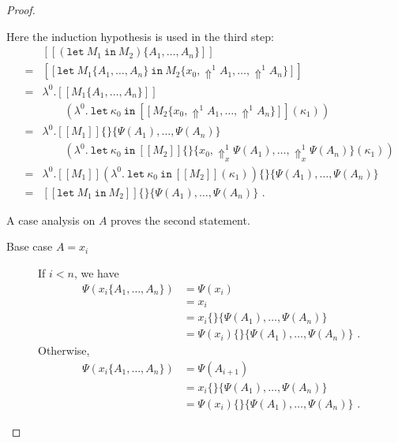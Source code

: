 \documentclass[a4paper,11pt,draft]{article}
\newcommand{\kw}[1]{\mathtt{#1}}
\begin{document}
\begin{proof}
\begin{description}
  Here the induction hypothesis is used in the third step:
  \begin{eqnarray*} %
    &   & [\![(\kw{let} \: M_{1} \: \kw{in} \: M_{2})\{A_{1}, \ldots, A_{n}\}]\!] \\
    & = & [\![\kw{let} \: M_{1}\{A_{1}, \ldots, A_{n}\} \: \kw{in} \: M_{2}\{x_{0}, \Uparrow^{1} A_{1}, \ldots, \Uparrow^{1} A_{n}\}]\!] \\
    & = & \lambda^{0}.[\![M_{1}\{A_{1}, \ldots, A_{n}\}]\!] \\
    &   & \qquad (\lambda^{0}. \: \kw{let} \: \kappa_{0} \: \kw{in} \: [\![M_{2}\{x_{0}, \Uparrow^{1} A_{1}, \ldots, \Uparrow^{1} A_{n}\}]\!](\kappa_{1})) \\
    & = & \lambda^{0}.[\![M_{1}]\!]\{\}\{\Psi(A_{1}), \ldots, \Psi(A_{n})\} \\
    &   & \qquad (\lambda^{0}. \: \kw{let} \: \kappa_{0} \: \kw{in} \: [\![M_{2}]\!]\{\}\{x_{0}, \Uparrow_{x}^{1} \Psi(A_{1}), \ldots, \Uparrow_{x}^{1} \Psi(A_{n})\}(\kappa_{1})) \\
    & = & \lambda^{0}.[\![M_{1}]\!](\lambda^{0}. \: \kw{let} \: \kappa_{0} \: \kw{in} \: [\![M_{2}]\!](\kappa_{1}))\{\}\{\Psi(A_{1}), \ldots, \Psi(A_{n})\} \\
    & = & [\![\kw{let} \: M_{1} \: \kw{in} \: M_{2}]\!]\{\}\{\Psi(A_{1}), \ldots, \Psi(A_{n})\} \text{ .}
  \end{eqnarray*}
\end{description}

A case analysis on $A$ proves the second statement.

\begin{description}
\item[\sffamily Base case $A = x_{i}$]\hfill

  If $i < n$, we have
  \begin{align*}
    \Psi(x_{i}\{A_{1}, \ldots, A_{n}\}) &= \Psi(x_{i}) \\
                                      &= x_{i} \\
                                      &= x_{i}\{\}\{\Psi(A_{1}), \ldots, \Psi(A_{n})\} \\
                                      &= \Psi(x_{i})\{\}\{\Psi(A_{1}), \ldots, \Psi(A_{n})\} \text{ .}
  \end{align*}
  Otherwise,
  \begin{align*}
    \Psi(x_{i}\{A_{1}, \ldots, A_{n}\}) &= \Psi(A_{i+1}) \\
                                      &= x_{i}\{\}\{\Psi(A_{1}), \ldots, \Psi(A_{n})\} \\
                                      &= \Psi(x_{i})\{\}\{\Psi(A_{1}), \ldots, \Psi(A_{n})\} \text{ .}
  \end{align*}


\end{description}
\end{proof}
\end{document}
